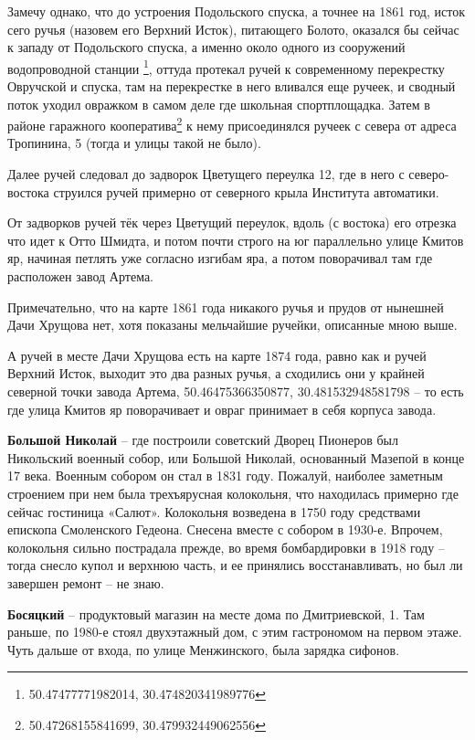 Замечу однако, что до устроения Подольского спуска, а точнее на 1861 год, исток сего ручья (назовем его Верхний Исток), питающего Болото, оказался бы сейчас к западу от Подольского спуска, а именно около одного из сооружений водопроводной станции \footnote{50.47477771982014, 30.474820341989776}, оттуда протекал ручей к современному перекрестку Овручской и спуска, там на перекрестке в него вливался еще ручеек, и сводный поток уходил овражком в самом деле где школьная спортплощадка. Затем в районе гаражного кооператива\footnote{50.47268155841699, 30.479932449062556} к нему присоединялся ручеек с севера от адреса Тропинина, 5 (тогда и улицы такой не было).

Далее ручей следовал до задворок Цветущего переулка 12, где в него с северо-востока струился ручей примерно от северного крыла Института автоматики.

От задворков ручей тёк через Цветущий переулок, вдоль (с востока) его отрезка что идет к Отто Шмидта, и потом почти строго на юг параллельно улице Кмитов яр, начиная петлять уже согласно изгибам яра, а потом поворачивал там где расположен завод Артема.

Примечательно, что на карте 1861 года никакого ручья и прудов от нынешней Дачи Хрущова нет, хотя показаны мельчайшие ручейки, описанные мною выше. 

А ручей в месте Дачи Хрущова есть на карте 1874 года, равно как и ручей Верхний Исток, выходит это два разных ручья, а сходились они у крайней северной точки завода Артема, 50.46475366350877, 30.481532948581798 – то есть где улица Кмитов яр поворачивает и овраг принимает в себя корпуса завода.\\

\medskip

\textbf{Большой Николай} – где построили советский Дворец Пионеров был Никольский военный собор, или Большой Николай, основанный Мазепой в конце 17 века. Военным собором он стал в 1831 году. Пожалуй, наиболее заметным строением при нем была трехъярусная колокольня, что находилась примерно где сейчас гостиница «Салют». Колокольня возведена в 1750 году средствами епископа Смоленского Гедеона. Снесена вместе с собором в 1930-е. Впрочем, колокольня сильно пострадала прежде, во время бомбардировки в 1918 году – тогда снесло купол и верхнюю часть, и ее принялись восстанавливать, но был ли завершен ремонт – не знаю.\\

\medskip

\textbf{Босяцкий} – продуктовый магазин на месте дома по Дмитриевской, 1. Там раньше, по 1980-е стоял двухэтажный дом, с этим гастрономом на первом этаже. Чуть дальше от входа, по улице Менжинского, была зарядка сифонов.\\

